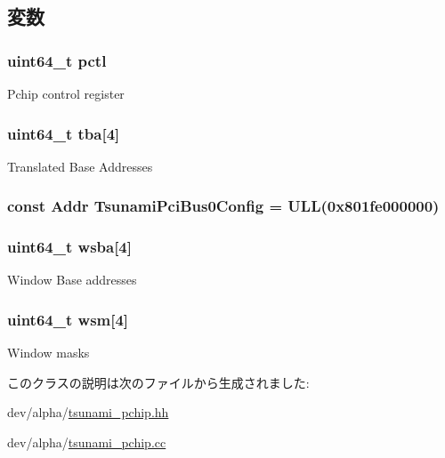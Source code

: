 \subsection{変数}
\hypertarget{classTsunamiPChip_a8df2c098b72e9eee77a79290c8e4a6c5}{
\subsubsection[{pctl}]{\setlength{\rightskip}{0pt plus 5cm}uint64\_\-t {\bf pctl}}}
\label{classTsunamiPChip_a8df2c098b72e9eee77a79290c8e4a6c5}
Pchip control register \hypertarget{classTsunamiPChip_ad35698b8e7094fe0888d00cad38965ec}{
\subsubsection[{tba}]{\setlength{\rightskip}{0pt plus 5cm}uint64\_\-t {\bf tba}\mbox{[}4\mbox{]}}}
\label{classTsunamiPChip_ad35698b8e7094fe0888d00cad38965ec}
Translated Base Addresses \hypertarget{classTsunamiPChip_a8a9c49447e0f2ce2f8aaf2c7a4299eac}{
\subsubsection[{TsunamiPciBus0Config}]{\setlength{\rightskip}{0pt plus 5cm}const {\bf Addr} {\bf TsunamiPciBus0Config} = ULL(0x801fe000000)}}
\label{classTsunamiPChip_a8a9c49447e0f2ce2f8aaf2c7a4299eac}
\hypertarget{classTsunamiPChip_a8281ba8e4694bf75ec8b8b5d4d4ad50f}{
\subsubsection[{wsba}]{\setlength{\rightskip}{0pt plus 5cm}uint64\_\-t {\bf wsba}\mbox{[}4\mbox{]}}}
\label{classTsunamiPChip_a8281ba8e4694bf75ec8b8b5d4d4ad50f}
Window Base addresses \hypertarget{classTsunamiPChip_a16d1e04d18db960e6c8059d404989395}{
\subsubsection[{wsm}]{\setlength{\rightskip}{0pt plus 5cm}uint64\_\-t {\bf wsm}\mbox{[}4\mbox{]}}}
\label{classTsunamiPChip_a16d1e04d18db960e6c8059d404989395}
Window masks 

このクラスの説明は次のファイルから生成されました:\begin{DoxyCompactItemize}
\item 
dev/alpha/\hyperlink{tsunami__pchip_8hh}{tsunami\_\-pchip.hh}\item 
dev/alpha/\hyperlink{tsunami__pchip_8cc}{tsunami\_\-pchip.cc}\end{DoxyCompactItemize}
